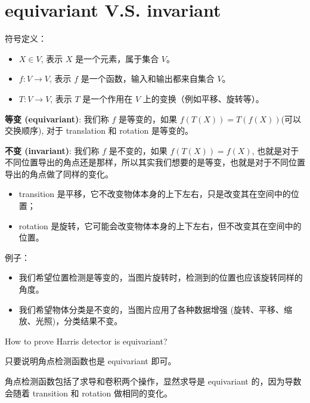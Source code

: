 \section{equivariant V.S. invariant}
\begin{definition}

符号定义：

\begin{itemize}
    \item $X \in V$, 表示 $X$ 是一个元素，属于集合 $V$。
    \item $f : V \to V$, 表示 $f$ 是一个函数，输入和输出都来自集合 $V$。
    \item $T : V \to V$, 表示 $T$ 是一个作用在 $V$ 上的变换（例如平移、旋转等）。
\end{itemize}


\textbf{等变 (equivariant)}: 我们称 $f$ 是等变的，如果 $f(T(X))=T(f(X))$(可以交换顺序), 对于 translation 和 rotation 是等变的。

\textbf{不变 (invariant)}: 我们称 $f$ 是不变的，如果 $f(T(X))=f(X)$, 也就是对于不同位置导出的角点还是那样，所以其实我们想要的是等变，也就是对于不同位置导出的角点做了同样的变化。

\begin{remark}
    \begin{itemize}
        \item transition 是平移，它不改变物体本身的上下左右，只是改变其在空间中的位置；
        \item rotation 是旋转，它可能会改变物体本身的上下左右，但不改变其在空间中的位置。
    \end{itemize}
\end{remark}

例子：

\begin{itemize}
    \item 我们希望位置检测是等变的，当图片旋转时，检测到的位置也应该旋转同样的角度。
    \item 我们希望物体分类是不变的，当图片应用了各种数据增强 (旋转、平移、缩放、光照)，分类结果不变。
\end{itemize}


\end{definition}

\begin{problem}
    How to prove Harris detector is equivariant?
\end{problem}


只要说明角点检测函数也是 equivariant 即可。

角点检测函数包括了求导和卷积两个操作，显然求导是 equivariant 的，因为导数会随着 transition 和 rotation 做相同的变化。

